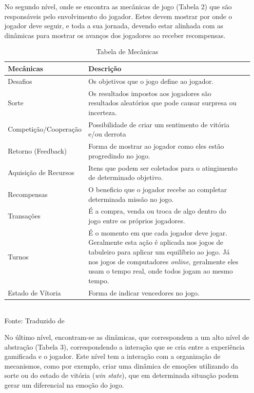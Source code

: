 \documentclass[
	12pt,				%
	openany,			%
	oneside,			%
	a4paper,			%
	english,			%
	french,				%
	spanish,			%
	brazil				%
	]{abntex2}
\begin{document}
No segundo nível, onde se encontra as mecânicas de jogo (Tabela 2) que são responsáveis pelo envolvimento do jogador. Estes devem mostrar por onde o jogador deve seguir, e toda a sua jornada, devendo estar alinhada com as dinâmicas para mostrar os avanços dos jogadores ao receber recompensas.

\begin{table}[H]
\caption{Tabela de Mecânicas}
\begin{tabularx}{\linewidth}{|p{5cm}|X|l|} \hline
\textbf{Mecânicas} & \textbf{Descrição} \\ \hline

Desafios & Os objetivos que o jogo define ao jogador. \\ \hline
Sorte & Os resultados impostos aos jogadores são resultados aleatórios que pode causar surpresa ou incerteza. \\ \hline
Competição/Cooperação & Possibilidade de criar um sentimento de vitória e/ou derrota\\ \hline
Retorno (Feedback) & Forma de mostrar ao jogador como eles estão progredindo no jogo. \\ \hline 
Aquisição de Recursos & Itens que podem ser coletados para o atingimento de determinado objetivo.\\ \hline 
Recompensas & O beneficio que o jogador recebe ao completar determinada missão no jogo. \\ \hline 
Transações & É a compra, venda ou troca de algo dentro do jogo entre os próprios jogadores.\\ \hline 
Turnos & É o momento em que cada jogador deve jogar. Geralmente esta ação é aplicada nos jogos de tabuleiro para aplicar um equilíbrio ao jogo. Já nos jogos de computadores \textit{online}, geralmente eles usam o tempo real, onde todos jogam ao mesmo tempo. \\ \hline 
Estado de Vítoria & Forma de indicar vencedores no jogo.\\ \hline 

\end{tabularx}
\\

Fonte: Traduzido de 
\label{Tab:larguracolunas}
\end{table}


No último nível, encontram-se as dinâmicas, que correspondem a um alto nível de abstração (Tabela 3), correspondendo a interação que se cria entre a experiência gamificada e o jogador. Este nível tem a interação com a organização de mecanismos, como por exemplo, criar uma dinâmica de emoções utilizando da sorte ou do estado de vitória (\textit{win state}), que em determinada situação podem gerar um diferencial na emoção do jogo.
\end{document}
